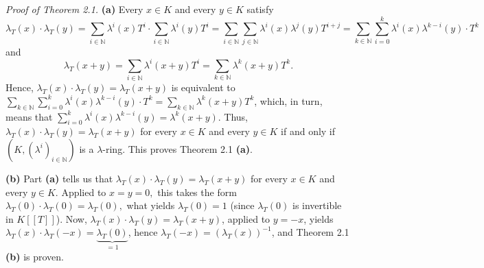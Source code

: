 \documentclass[12pt,final,notitlepage,onecolumn,german]{article}%
\begin{document}
\textit{Proof of Theorem 2.1.} \textbf{(a)} Every $x\in K$ and every $y\in K$
satisfy%
\[
\lambda_{T}\left(  x\right)  \cdot\lambda_{T}\left(  y\right)  =\sum
\limits_{i\in\mathbb{N}}\lambda^{i}\left(  x\right)  T^{i}\cdot\sum
\limits_{i\in\mathbb{N}}\lambda^{i}\left(  y\right)  T^{i}=\sum\limits_{i\in
\mathbb{N}}\sum\limits_{j\in\mathbb{N}}\lambda^{i}\left(  x\right)
\lambda^{j}\left(  y\right)  T^{i+j}=\sum_{k\in\mathbb{N}}\sum_{i=0}%
^{k}\lambda^{i}\left(  x\right)  \lambda^{k-i}\left(  y\right)  \cdot T^{k}%
\]
and%
\[
\lambda_{T}\left(  x+y\right)  =\sum_{i\in\mathbb{N}}\lambda^{i}\left(
x+y\right)  T^{i}=\sum_{k\in\mathbb{N}}\lambda^{k}\left(  x+y\right)  T^{k}.
\]
Hence, $\lambda_{T}\left(  x\right)  \cdot\lambda_{T}\left(  y\right)
=\lambda_{T}\left(  x+y\right)  $ is equivalent to $\sum\limits_{k\in
\mathbb{N}}\sum\limits_{i=0}^{k}\lambda^{i}\left(  x\right)  \lambda
^{k-i}\left(  y\right)  \cdot T^{k}=\sum\limits_{k\in\mathbb{N}}\lambda
^{k}\left(  x+y\right)  T^{k}$, which, in turn, means that $\sum
\limits_{i=0}^{k}\lambda^{i}\left(  x\right)  \lambda^{k-i}\left(  y\right)
=\lambda^{k}\left(  x+y\right)  $. Thus, $\lambda_{T}\left(  x\right)
\cdot\lambda_{T}\left(  y\right)  =\lambda_{T}\left(  x+y\right)  $ for every
$x\in K$ and every $y\in K$ if and only if $\left(  K,\left(  \lambda
^{i}\right)  _{i\in\mathbb{N}}\right)  $ is a $\lambda$-ring. This proves
Theorem 2.1 \textbf{(a)}.

\textbf{(b)} Part \textbf{(a)} tells us that $\lambda_{T}\left(  x\right)
\cdot\lambda_{T}\left(  y\right)  =\lambda_{T}\left(  x+y\right)  $ for every
$x\in K$ and every $y\in K$. Applied to $x=y=0,$ this takes the form
$\lambda_{T}\left(  0\right)  \cdot\lambda_{T}\left(  0\right)  =\lambda
_{T}\left(  0\right)  ,$ what yields $\lambda_{T}\left(  0\right)  =1$ (since
$\lambda_{T}\left(  0\right)  $ is invertible in $K\left[  \left[  T\right]
\right]  $). Now, $\lambda_{T}\left(  x\right)  \cdot\lambda_{T}\left(
y\right)  =\lambda_{T}\left(  x+y\right)  $, applied to $y=-x$, yields
$\lambda_{T}\left(  x\right)  \cdot\lambda_{T}\left(  -x\right)
=\underbrace{\lambda_{T}\left(  0\right)  }_{=1}$, hence $\lambda_{T}\left(
-x\right)  =\left(  \lambda_{T}\left(  x\right)  \right)  ^{-1}$, and Theorem
2.1 \textbf{(b)} is proven.
\end{document}

